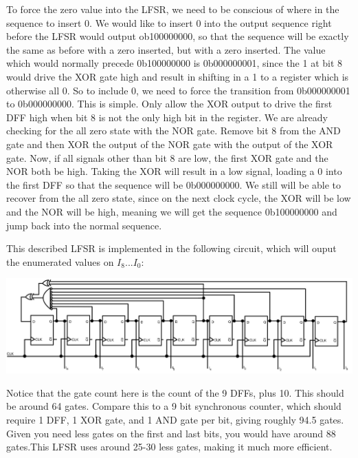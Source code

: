 \documentclass{article}
\begin{document}
\begin{enumerate}
            To force the zero value into the LFSR, we need to be conscious of
            where in the sequence to insert 0. We would like to insert 0 into
            the output sequence right before the LFSR would output ob100000000,
            so that the sequence will be exactly the same as before with a zero
            inserted, but with a zero inserted. The value which would normally
            precede 0b100000000 is 0b000000001, since the 1 at bit 8 would drive
            the XOR gate high and result in shifting in a 1 to a register which
            is otherwise all 0. So to include 0, we need to force the transition
            from 0b000000001 to 0b000000000. This is simple. Only allow the XOR
            output to drive the first DFF high when bit 8 is not the only high 
            bit in the register. We are already checking for the all zero state
            with the NOR gate. Remove bit 8 from the AND gate and then XOR the
            output of the NOR gate with the output of the XOR gate. Now, if all
            signals other than bit 8 are low, the first XOR gate and the NOR
            both be high. Taking the XOR will result in a low signal, loading a
            0 into the first DFF so that the sequence will be 0b000000000. We
            still will be able to recover from the all zero state, since on the
            next clock cycle, the XOR will be low and the NOR will be high,
            meaning we will get the sequence 0b100000000 and jump back into the 
            normal sequence.

            This described LFSR is implemented in the following circuit, which
            will ouput the enumerated values on $I_8...I_0$:
            \begin{center}
                \includegraphics[width=\textwidth]{figs/p2.jpeg}
            \end{center}

            Notice that the gate count here is the count of the 9 DFFs, plus 10.
            This should be around 64 gates. Compare this to a 9 bit synchronous
            counter, which should require 1 DFF, 1 XOR gate, and 1 AND gate per
            bit, giving roughly 94.5 gates. Given you need less gates on the first
            and last bits, you would have around 88 gates.This LFSR uses around
            25-30 less gates, making it much more efficient.
            \pagebreak


\end{enumerate}
\end{document}
